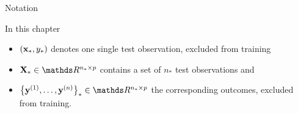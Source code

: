 









\begin{vbframe}{Notation}
% 
% 
% 
% 
% 

In this chapter 

\begin{itemize}
\item $(\mathbf{x}_*, y_*)$ denotes one single test observation, excluded from training
\item $\Xmat_* \in \R^{n_* \times p}$ contains a set of $n_*$ test observations and  
\item $\ydat_* \in \R^{n_* \times p}$ the corresponding outcomes, excluded from training. 
\end{itemize}








\end{vbframe}
